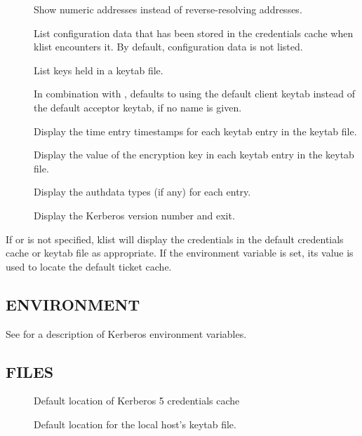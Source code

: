 \documentclass[letterpaper,10pt,english]{sphinxmanual}
\begin{document}
\begin{description}
\item[{}] \leavevmode
Show numeric addresses instead of reverse-resolving addresses.

\item[{}] \leavevmode
List configuration data that has been stored in the credentials
cache when klist encounters it.  By default, configuration data
is not listed.

\item[{}] \leavevmode
List keys held in a keytab file.

\item[{}] \leavevmode
In combination with , defaults to using the default client
keytab instead of the default acceptor keytab, if no name is
given.

\item[{}] \leavevmode
Display the time entry timestamps for each keytab entry in the
keytab file.

\item[{}] \leavevmode
Display the value of the encryption key in each keytab entry in
the keytab file.

\item[{}] \leavevmode
Display the authdata types (if any) for each entry.

\item[{}] \leavevmode
Display the Kerberos version number and exit.

\end{description}

If  or  is not specified, klist will display
the credentials in the default credentials cache or keytab file as
appropriate.  If the  environment variable is set, its
value is used to locate the default ticket cache.


\subsection{ENVIRONMENT}
\label{\detokenize{user/user_commands/klist:environment}}
See {\hyperref[\detokenize{user/user_config/kerberos:kerberos-7}]{}} for a description of Kerberos environment
variables.


\subsection{FILES}
\label{\detokenize{user/user_commands/klist:files}}\begin{description}
\item[{}] \leavevmode
Default location of Kerberos 5 credentials cache

\item[{}] \leavevmode
Default location for the local host’s keytab file.

\end{description}
\end{document}
